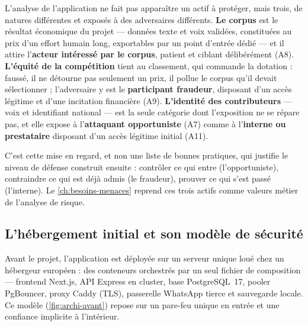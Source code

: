 L'analyse de l'application ne fait pas apparaître un actif à protéger, mais trois, de natures
différentes et exposés à des adversaires différents. \textbf{Le corpus} est le résultat
économique du projet --- données texte et voix validées, constituées au prix d'un effort humain
long, exportables par un point d'entrée dédié --- et il attire l'\textbf{acteur intéressé par le
corpus}, patient et ciblant délibérément (A8). \textbf{L'équité de la compétition} tient au
classement, qui commande la dotation : faussé, il ne détourne pas seulement un prix, il pollue le
corpus qu'il devait sélectionner ; l'adversaire y est le \textbf{participant fraudeur},
disposant d'un accès légitime et d'une incitation financière (A9). \textbf{L'identité des
contributeurs} --- voix et identifiant national --- est la seule catégorie dont l'exposition ne
se répare pas, et elle expose à l'\textbf{attaquant opportuniste} (A7) comme à
l'\textbf{interne ou prestataire} disposant d'un accès légitime initial (A11).

C'est cette mise en regard, et non une liste de bonnes pratiques, qui justifie le niveau de
défense construit ensuite : contrôler ce qui entre (l'opportuniste), contraindre ce qui est déjà
admis (le fraudeur), prouver ce qui s'est passé (l'interne). Le \cref{ch:besoins-menaces} reprend
ces trois actifs comme valeurs métier de l'analyse de risque.

\subsection{L'hébergement initial et son modèle de sécurité}
\label{subsec:hebergement-initial}

Avant le projet, l'application est déployée sur un serveur unique loué chez un hébergeur
européen : des conteneurs orchestrés par un seul fichier de composition --- frontend Next.js,
API Express en cluster, base PostgreSQL~17, pooler PgBouncer, proxy Caddy (TLS), passerelle
WhatsApp tierce et sauvegarde locale. Ce modèle (\cref{fig:archi-avant}) repose sur un pare-feu
unique en entrée et une confiance implicite à l'intérieur.


